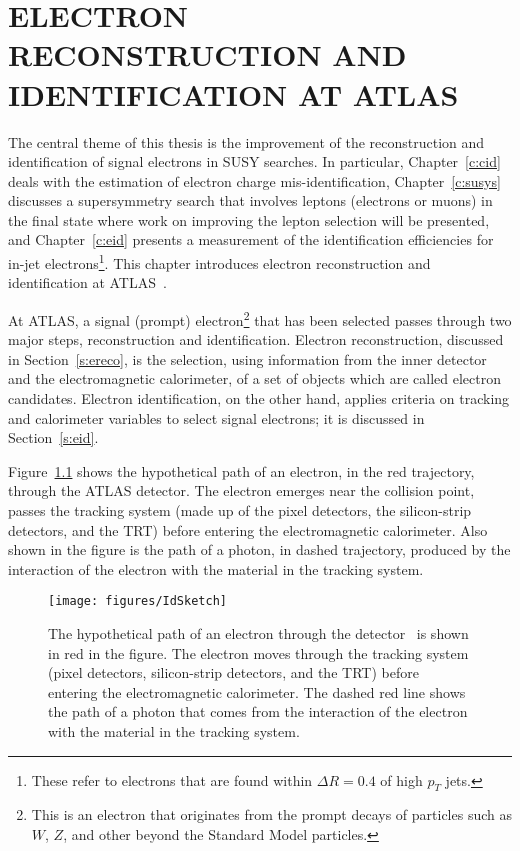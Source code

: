 
\chapter{ELECTRON RECONSTRUCTION AND IDENTIFICATION AT ATLAS}\label{c:ereid}

The central theme of this thesis is the improvement of the reconstruction and
identification of signal electrons in SUSY searches. In particular,
Chapter~\ref{c:cid} deals with the estimation of electron charge
mis-identification, Chapter~\ref{c:susys} discusses a supersymmetry search that
involves leptons (electrons or muons) in the final state where work on
improving the lepton selection will be presented, and Chapter~\ref{c:eid}
presents a measurement of the identification efficiencies for in-jet
electrons\footnote{These refer to electrons that are found within $\Delta R =
0.4$ of high $p_T$ jets.}. This chapter introduces electron reconstruction and
identification at ATLAS~\cite{atlaselcid}.

At ATLAS, a signal (prompt) electron\footnote{This is an electron that
originates from the prompt decays of particles such as $W$, $Z$, and other
beyond the Standard Model particles.} that has been selected passes through two
major steps, reconstruction and identification. Electron reconstruction,
discussed in Section~\ref{s:ereco}, is the selection, using information from
the inner detector and the electromagnetic calorimeter, of a set of objects
which are called electron candidates. Electron identification, on the other
hand, applies criteria on tracking and calorimeter variables to select signal
electrons; it is discussed in Section~\ref{s:eid}.

Figure~\ref{f:elcid}\cite{atlaselcid} shows the hypothetical path of an
electron, in the red trajectory, through the ATLAS detector. The electron
emerges near the collision point, passes the tracking system (made up of the
pixel detectors, the silicon-strip detectors, and the TRT) before entering the
electromagnetic calorimeter. Also shown in the figure is the path of a photon,
in dashed trajectory, produced by the interaction of the electron with the
material in the tracking system.

\begin{figure}[h]
	\texttt{[image: figures/IdSketch]}
	\centering

	\caption{The hypothetical path of an electron through the
		detector~\cite{atlaselcid} is shown in red in the figure. The electron moves
		through the tracking system (pixel detectors, silicon-strip detectors, and the
		TRT) before entering the electromagnetic calorimeter. The dashed red line shows
		the path of a photon that comes from the interaction of the electron with the
		material in the tracking system.}

	\label{f:elcid}

\end{figure}

